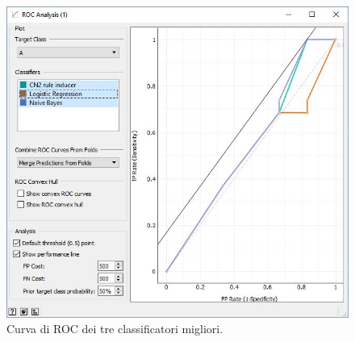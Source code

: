 \documentclass[a4paper, 12p]{report}
\begin{document}
\begin{figure}	
	\centering
	\includegraphics[scale = 0.6]{img/ROC.JPG}
	\caption{Curva di ROC dei tre classificatori migliori.}\label{fig:9}
\end{figure}

\appendix
\end{document}
